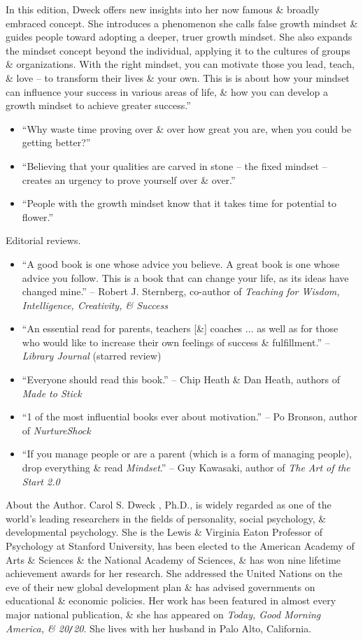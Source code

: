 \documentclass{article}
\begin{document}
\begin{enumerate}
	In this edition, {\sc Dweck} offers new insights into her now famous \& broadly embraced concept. She introduces a phenomenon she calls false growth mindset \& guides people toward adopting a deeper, truer growth mindset. She also expands the mindset concept beyond the individual, applying it to the cultures of groups \& organizations. With the right mindset, you can motivate those you lead, teach, \& love -- to transform their lives \& your own. This is is about how your mindset can influence your success in various areas of life, \& how you can develop a growth mindset to achieve greater success.''
	\begin{itemize}
		\item ``Why waste time proving over \& over how great you are, when you could be getting better?''
		\item ``Believing that your qualities are carved in stone -- the fixed mindset -- creates an urgency to prove yourself over \& over.''
		\item ``People with the growth mindset know that it takes time for potential to flower.''
	\end{itemize}
	{\sf Editorial reviews.}
	\begin{itemize}
		\item ``A good book is one whose advice you believe. A great book is one whose advice you follow. This is a book that can change your life, as its ideas have changed mine.'' -- {\sc Robert J. Sternberg}, co-author of {\it Teaching for Wisdom, Intelligence, Creativity, \& Success}
		\item ``An essential read for parents, teachers [\&] coaches $\ldots$ as well as for those who would like to increase their own feelings of success \& fulfillment.'' -- {\it Library Journal} (starred review)
		\item ``Everyone should read this book.'' -- {\sc Chip Heath \& Dan Heath}, authors of {\it Made to Stick}
		\item ``1 of the most influential books ever about motivation.'' -- {\sc Po Bronson}, author of {\it NurtureShock}
		\item ``If you manage people or are a parent (which is a form of managing people), drop everything \& read {\it Mindset}.'' -- {\sc Guy Kawasaki}, author of {\it The Art of the Start 2.0}
	\end{itemize}
	{\sf About the Author.} {\sc Carol S. Dweck} , Ph.D., is widely regarded as one of the world's leading researchers in the fields of personality, social psychology, \& developmental psychology. She is the Lewis \& Virginia Eaton Professor of Psychology at Stanford University, has been elected to the American Academy of Arts \& Sciences \& the National Academy of Sciences, \& has won nine lifetime achievement awards for her research. She addressed the United Nations on the eve of their new global development plan \& has advised governments on educational \& economic policies. Her work has been featured in almost every major national publication, \& she has appeared on {\it Today, Good Morning America, \& 20{\tt/}20}. She lives with her husband in Palo Alto, California.


\end{enumerate}
\end{document}
